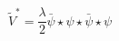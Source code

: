 \begin{equation}
     \widetilde{V}^*=\frac{\lambda}{2}
     \bar{\psi}\star\psi\star\bar{\psi}\star\psi
     \label{ourpot}
\end{equation}


